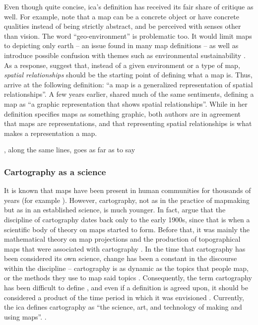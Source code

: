 Even though quite concise,
\acrshort{ica}'s definition has received its fair share of critique as well.
For example, \textcite{lap2021} note that
a map can be a concrete object or have concrete qualities
instead of being strictly abstract,
and be perceived with senses other than vision.
The word \enquote{geo-environment} is problematic too.
It would limit maps to depicting only earth
-- an issue found in many map definitions \parencite{tyn2014} --
as well as introduce possible confusion with themes such as
environmental sustainability \parencite{lap2021}.
As a response, \textcite{lap2021} suggest that,
instead of a given environment or a type of map,
\textit{spatial relationships} should be the starting point of defining what a map is.
Thus, \citeauthor{lap2021} arrive at the following definition:
\enquote{a map is a generalized representation of spatial relationships}.
A few years earlier, \textcite{tyn2014} shared much of the same sentiments,
defining a map as \enquote{a graphic representation that shows spatial relationships}.
While in her definition \citeauthor{tyn2014} specifies maps as something graphic,
both authors are in agreement that maps are representations,
and that representing spatial relationships is what makes a representation a map.

\textcite{mac2004}, along the same lines, goes as far as to say

\subsubsection{Cartography as a science}
It is known that
maps have been present in human communities for thousands of years
(for example \textcite{hsu1993, sch2014}).
However, cartography,
not as in the practice of mapmaking but as in an established science,
is much younger.
In fact, \textcite{woo2003, kai2020} argue that
the discipline of cartography dates back only to the early 1900s,
since that is when a scientific body of theory on maps started to form.
Before that, it was mainly the mathematical theory on map projections
and the production of topographical maps
that were associated with cartography \parencite{kai2020}.
In the time that cartography has been considered its own science,
change has been a constant in the discourse within the discipline \parencite{mac2004} --
cartography is as dynamic as the topics that people map,
or the methods they use to map said topics \parencite{tyn1992, tyn2014}.
Consequently,
the term cartography has been difficult to define \parencite{kry1995},
and even if a definition is agreed upon,
it should be considered a product of the time period
in which it was envisioned \parencite{tyn1992, and1996}.
Currently, the \acrshort{ica} defines cartography as
\enquote{the science, art, and technology of making and using maps}.
\parencite{ica2019}.

